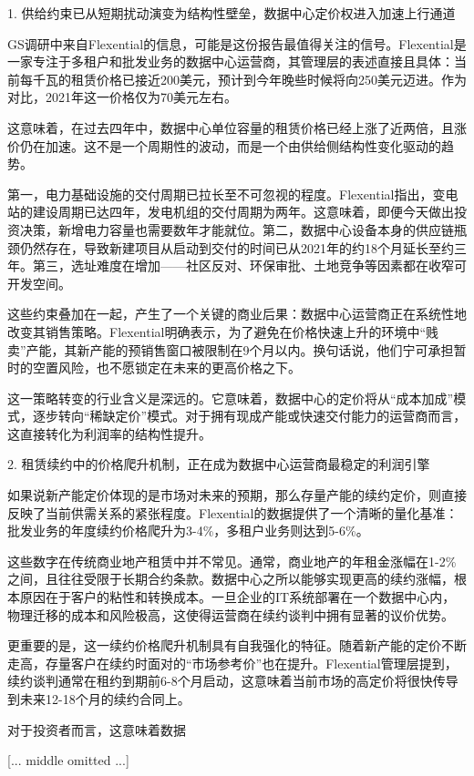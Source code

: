 \documentclass[11pt]{ctexart}
\begin{document}
1. 供给约束已从短期扰动演变为结构性壁垒，数据中心定价权进入加速上行通道

GS调研中来自Flexential的信息，可能是这份报告最值得关注的信号。Flexential是一家专注于多租户和批发业务的数据中心运营商，其管理层的表述直接且具体：当前每千瓦的租赁价格已接近200美元，预计到今年晚些时候将向250美元迈进。作为对比，2021年这一价格仅为70美元左右。

这意味着，在过去四年中，数据中心单位容量的租赁价格已经上涨了近两倍，且涨价仍在加速。这不是一个周期性的波动，而是一个由供给侧结构性变化驱动的趋势。

第一，电力基础设施的交付周期已拉长至不可忽视的程度。Flexential指出，变电站的建设周期已达四年，发电机组的交付周期为两年。这意味着，即便今天做出投资决策，新增电力容量也需要数年才能就位。第二，数据中心设备本身的供应链瓶颈仍然存在，导致新建项目从启动到交付的时间已从2021年的约18个月延长至约三年。第三，选址难度在增加——社区反对、环保审批、土地竞争等因素都在收窄可开发空间。

这些约束叠加在一起，产生了一个关键的商业后果：数据中心运营商正在系统性地改变其销售策略。Flexential明确表示，为了避免在价格快速上升的环境中“贱卖”产能，其新产能的预销售窗口被限制在9个月以内。换句话说，他们宁可承担暂时的空置风险，也不愿锁定在未来的更高价格之下。

这一策略转变的行业含义是深远的。它意味着，数据中心的定价将从“成本加成”模式，逐步转向“稀缺定价”模式。对于拥有现成产能或快速交付能力的运营商而言，这直接转化为利润率的结构性提升。

2. 租赁续约中的价格爬升机制，正在成为数据中心运营商最稳定的利润引擎

如果说新产能定价体现的是市场对未来的预期，那么存量产能的续约定价，则直接反映了当前供需关系的紧张程度。Flexential的数据提供了一个清晰的量化基准：批发业务的年度续约价格爬升为3-4\%，多租户业务则达到5-6\%。

这些数字在传统商业地产租赁中并不常见。通常，商业地产的年租金涨幅在1-2\%之间，且往往受限于长期合约条款。数据中心之所以能够实现更高的续约涨幅，根本原因在于客户的粘性和转换成本。一旦企业的IT系统部署在一个数据中心内，物理迁移的成本和风险极高，这使得运营商在续约谈判中拥有显著的议价优势。

更重要的是，这一续约价格爬升机制具有自我强化的特征。随着新产能的定价不断走高，存量客户在续约时面对的“市场参考价”也在提升。Flexential管理层提到，续约谈判通常在租约到期前6-8个月启动，这意味着当前市场的高定价将很快传导到未来12-18个月的续约合同上。

对于投资者而言，这意味着数据

[... middle omitted ...]
\end{document}
